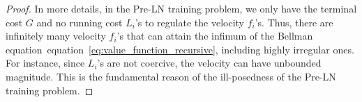 \documentclass[10pt,a4paper]{amsart}
\newcommand{\bfX}{{\bf X}}
\newcommand{\bfy}{ {\bf y}}
\def\eqref#1{equation~\ref{#1}}
\begin{document}
\begin{proof}
    In more details, in the Pre-LN training problem, we only have the terminal cost $G$ and no running cost $L_i$'s to regulate the  velocity $f_i$'s. Thus, there are infinitely many velocity $f_i$'s that can attain the infimum of the Bellman equation~\eqref{eq:value_function_recursive}, including highly irregular ones. For instance, since $L_i$'s are not coercive, the velocity can have unbounded magnitude. This is the fundamental reason of the ill-posedness of the Pre-LN training problem.
\end{proof}
\end{document}
